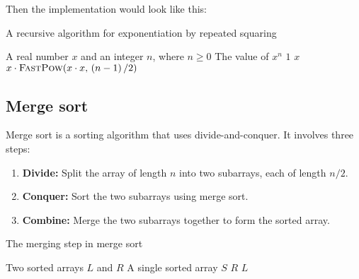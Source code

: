 Then the implementation would look like this:
\begin{algorithm}[H]
    \caption{A recursive algorithm for exponentiation by repeated squaring}
    \begin{algorithmic}[1]
    \Require A real number $x$ and an integer $n$, where $n \ge 0$
    \Ensure The value of $x^n$
        \Return $1$
        \Return $x$
        \Return {}
        \Return $x \cdot \text{\Call{FastPow}{$x \cdot x$, $\left(n-1\right)/2$}}$
    \EndIf
    \EndFunction 
    \end{algorithmic}
\end{algorithm}

\subsection{Merge sort}
Merge sort is a sorting algorithm that uses divide-and-conquer. It involves three steps:
\begin{enumerate}
    \item \textbf{Divide:} Split the array of length $n$ into two subarrays, each of length $n/2$.
    \item \textbf{Conquer:} Sort the two subarrays using merge sort.
    \item \textbf{Combine:} Merge the two subarrays together to form the sorted array.
\end{enumerate}

\begin{algorithm}[H]
    \caption{The merging step in merge sort}
    \begin{algorithmic}[1]
        \Require Two sorted arrays $L$ and $R$
        \Ensure A single sorted array $S$
                \Return $R$
                \Return $L$
            \EndIf
                \Return {}
            \Else
                \Return {}
            \EndIf
        \EndFunction
    \end{algorithmic}
\end{algorithm}

